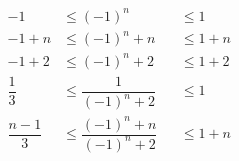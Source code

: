 \documentclass{article}
\begin{document}
$\begin{alignedat}{3}
	-1             & \leq (-1)^n                     && \leq 1\\
	-1+n           & \leq (-1)^n+n                   && \leq 1+n\\
	-1+2           & \leq (-1)^n+2                   && \leq 1+2\\
	\dfrac{1}{3}   & \leq \dfrac{1}{(-1)^n+2}        && \leq 1\\
	\dfrac{n-1}{3} & \leq \dfrac{(-1)^n+n}{(-1)^n+2} && \leq 1+n\\
\end{alignedat}$
\end{document}
